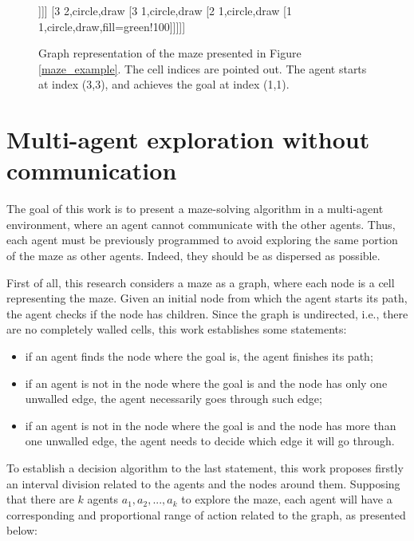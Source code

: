 \begin{figure}[ht!]
\centering
\begin{forest}
 [3 3,circle,draw,fill=red!100
 	[2 3,circle,draw
 		[2 2,circle,draw
 			[1 2,circle,draw
 				[1 3,circle,draw]]]]
 	[3 2,circle,draw
 		[3 1,circle,draw
 			[2 1,circle,draw
 				[1 1,circle,draw,fill=green!100]]]]]
\end{forest}
\caption{Graph representation of the maze presented in Figure \ref{maze_example}. The cell indices are pointed out. The agent starts at index (3,3), and achieves the goal at index (1,1).}
\label{maze_example_graph}
\end{figure}



\section{Multi-agent exploration without communication}
\label{section_models_exploration}
The goal of this work is to present a maze-solving algorithm in a multi-agent environment, where an agent cannot communicate with the other agents. Thus, each agent must be previously programmed to avoid exploring the same portion of the maze as other agents. Indeed, they should be as dispersed as possible.

First of all, this research considers a maze as a graph, where each node is a cell representing the maze. Given an initial node from which the agent starts its path, the agent checks if the node has children. Since the graph is undirected, i.e., there are no completely walled cells, this work establishes some statements:

\begin{itemize}
\item if an agent finds the node where the goal is, the agent finishes its path;

\item if an agent is not in the node where the goal is and the node has only one unwalled edge, the agent necessarily goes through such edge;

\item if an agent is not in the node where the goal is and the node has more than one unwalled edge, the agent needs to decide which edge it will go through.
\end{itemize}

To establish a decision algorithm to the last statement, this work proposes firstly an interval division related to the agents and the nodes around them. Supposing that there are $k$ agents $a_{1}, a_{2},...,a_{k}$ to explore the maze, each agent will have a corresponding and proportional range of action related to the graph, as presented below:

